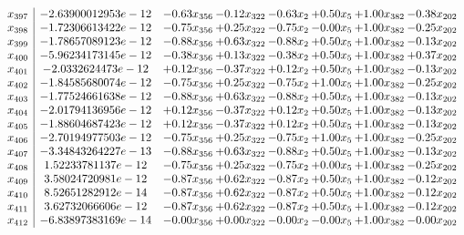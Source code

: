 \documentclass[8pt]{article}
\begin{document}
\[\begin{array}{c| c c@{\hskip 2pt} c@{\hskip 2pt} c@{\hskip 2pt} c@{\hskip 2pt} c@{\hskip 2pt} c@{\hskip 2pt} }
 x_{397}   &  -2.63900012953e-12 & -0.63 x_{356} & -0.12 x_{322} & -0.63 x_{2} & +  0.50 x_{5} & +  1.00 x_{382} & -0.38 x_{202}\\
 x_{398}   &  -1.72306613422e-12 & -0.75 x_{356} & +  0.25 x_{322} & -0.75 x_{2} & -0.00 x_{5} & +  1.00 x_{382} & -0.25 x_{202}\\
 x_{399}   &  -1.78657089123e-12 & -0.88 x_{356} & +  0.63 x_{322} & -0.88 x_{2} & +  0.50 x_{5} & +  1.00 x_{382} & -0.13 x_{202}\\
 x_{400}   &  -5.96234173145e-12 & -0.38 x_{356} & +  0.13 x_{322} & -0.38 x_{2} & +  0.50 x_{5} & +  1.00 x_{382} & +  0.37 x_{202}\\
 x_{401}   &  -2.0332624473e-12 & +  0.12 x_{356} & -0.37 x_{322} & +  0.12 x_{2} & +  0.50 x_{5} & +  1.00 x_{382} & -0.13 x_{202}\\
 x_{402}   &  -1.84585680074e-12 & -0.75 x_{356} & +  0.25 x_{322} & -0.75 x_{2} & +  1.00 x_{5} & +  1.00 x_{382} & -0.25 x_{202}\\
 x_{403}   &  -1.77524661638e-12 & -0.88 x_{356} & +  0.63 x_{322} & -0.88 x_{2} & +  0.50 x_{5} & +  1.00 x_{382} & -0.13 x_{202}\\
 x_{404}   &  -2.01794136956e-12 & +  0.12 x_{356} & -0.37 x_{322} & +  0.12 x_{2} & +  0.50 x_{5} & +  1.00 x_{382} & -0.13 x_{202}\\
 x_{405}   &  -1.88604687423e-12 & +  0.12 x_{356} & -0.37 x_{322} & +  0.12 x_{2} & +  0.50 x_{5} & +  1.00 x_{382} & -0.13 x_{202}\\
 x_{406}   &  -2.70194977503e-12 & -0.75 x_{356} & +  0.25 x_{322} & -0.75 x_{2} & +  1.00 x_{5} & +  1.00 x_{382} & -0.25 x_{202}\\
 x_{407}   &  -3.34843264227e-13 & -0.88 x_{356} & +  0.63 x_{322} & -0.88 x_{2} & +  0.50 x_{5} & +  1.00 x_{382} & -0.13 x_{202}\\
 x_{408}   &  1.52233781137e-12 & -0.75 x_{356} & +  0.25 x_{322} & -0.75 x_{2} & +  0.00 x_{5} & +  1.00 x_{382} & -0.25 x_{202}\\
 x_{409}   &  3.58024720981e-12 & -0.87 x_{356} & +  0.62 x_{322} & -0.87 x_{2} & +  0.50 x_{5} & +  1.00 x_{382} & -0.12 x_{202}\\
 x_{410}   &  8.52651282912e-14 & -0.87 x_{356} & +  0.62 x_{322} & -0.87 x_{2} & +  0.50 x_{5} & +  1.00 x_{382} & -0.12 x_{202}\\
 x_{411}   &  3.62732066606e-12 & -0.87 x_{356} & +  0.62 x_{322} & -0.87 x_{2} & +  0.50 x_{5} & +  1.00 x_{382} & -0.12 x_{202}\\
 x_{412}   &  -6.83897383169e-14 & -0.00 x_{356} & +  0.00 x_{322} & -0.00 x_{2} & -0.00 x_{5} & +  1.00 x_{382} & -0.00 x_{202}\\

\end{array}\]
\end{document}
